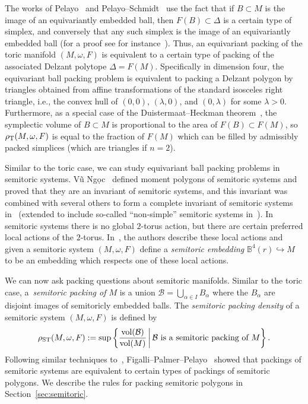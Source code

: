 \documentclass[pdftex]{sigma}
\numberwithin{equation}{section}
\newcommand{\De}{\Delta}
\newcommand{\om}{\omega}
\begin{document}
The works of Pelayo~\cite{Pe2006,Pe2007} and Pelayo--Schmidt~\cite{PeSc2008} use the fact that if $B\subset M$ is the image of an equivariantly embedded ball, then $F(B) \subset \De$ is a certain type of simplex, and conversely that any such simplex is the image of an equivariantly embedded ball (for a proof see for instance~\cite[Lemma 2.13]{PeSc2008}).
Thus, an equivariant packing of the toric manifold $(M,\om,F)$ is equivalent to a certain type of packing of the associated Delzant polytope $\De = F(M)$.
Specifically in dimension four, the equivariant ball packing problem is equivalent to packing a Delzant polygon by triangles obtained from affine transformations of the standard isosceles right triangle, i.e., the convex hull of $(0,0)$, $(\lambda,0)$, and $(0,\lambda)$ for some $\lambda>0$.
Furthermore, as a special case of the Duistermaat--Heckman theorem~\cite{DH-measure}, the symplectic volume of $B\subset M$ is proportional to the area of $F(B)\subset F(M)$, so $\rho_{{\rm T}}(M,\om,F)$ is equal to the fraction of $F(M)$ which can be filled by admissibly packed simplices (which are triangles if $n=2$).

Similar to the toric case, we can study equivariant ball packing problems in semitoric systems. V\~{u} Ng\d{o}c~\cite{VN2007} defined moment polygons of semitoric systems and proved that they are an invariant of semitoric systems, and this invariant was combined with several others to form a complete invariant of semitoric systems in~\cite{PeVN2009, PeVN2011} (extended to include so-called ``non-simple'' semitoric systems in~\cite{PPT-nonsimple}).
In semitoric systems there is no global $2$-torus action, but there are certain preferred local actions of the $2$-torus. In~\cite[Section 5]{FiPaPe2016}, the authors describe these local actions and given a semitoric system $(M,\om,F)$ define a \emph{semitoric embedding} $\mathbb{B}^4(r)\hookrightarrow M$ to be an embedding which respects one of these local actions.

We can now ask packing questions about semitoric manifolds.
Similar to the toric case, a~\emph{semitoric packing of $M$} is a union $\mathcal{B} = \bigcup_{\alpha\in I} B_\alpha$ where the $B_\alpha$ are disjoint images of semitoricly embedded balls.
The \emph{semitoric packing density} of a semitoric system $(M,\om,F)$ is defined by
\begin{equation}\label{eqn:maximal-semitoric-packing}
 \rho_{{\rm ST}}(M,\om,F) := \mathrm{sup} \left\{\frac{\text{vol}(\mathcal{B})}{\text{vol}(M)} \,  \bigg| \,  \mathcal{B} \text{ is a semitoric packing of $M$}\right\}.
\end{equation}
Following similar techniques to~\cite{Pe2006, Pe2007}, Figalli--Palmer--Pelayo~\cite{FiPaPe2016} showed that packings of semitoric systems are equivalent to certain types of packings of semitoric polygons.
We describe the rules for packing semitoric polygons in Section~\ref{sec:semitoric}.
\end{document}
